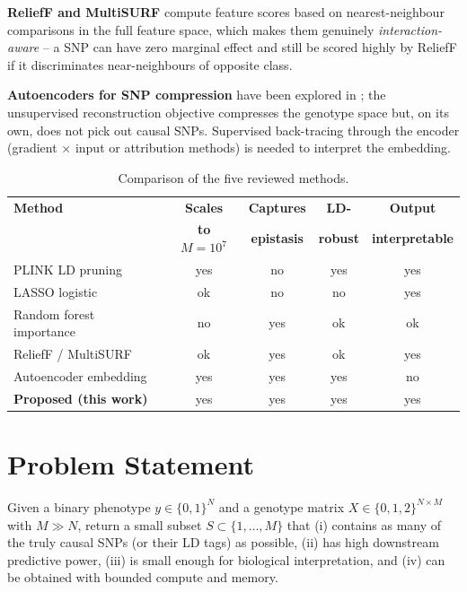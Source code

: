\documentclass[11pt,a4paper]{article}
\begin{document}
\textbf{ReliefF and MultiSURF} \cite{urbanowicz18} compute feature scores
based on nearest-neighbour comparisons in the full feature space, which
makes them genuinely \emph{interaction-aware} -- a SNP can have zero
marginal effect and still be scored highly by ReliefF if it discriminates
near-neighbours of opposite class.

\textbf{Autoencoders for SNP compression} have been explored in
\cite{romero17}; the unsupervised reconstruction objective compresses the
genotype space but, on its own, does not pick out causal SNPs. Supervised
back-tracing through the encoder (gradient $\times$ input or attribution
methods) is needed to interpret the embedding.

\begin{table}[H]
\centering
\caption{Comparison of the five reviewed methods. \label{tab:litreview}}
\begin{tabular}{lcccc}
\toprule
\textbf{Method} & \textbf{Scales} & \textbf{Captures} & \textbf{LD-} & \textbf{Output} \\
                & \textbf{to $M{=}10^7$} & \textbf{epistasis} & \textbf{robust} & \textbf{interpretable} \\
\midrule
PLINK LD pruning              & yes & no  & yes & yes \\
LASSO logistic                & ok  & no  & no  & yes \\
Random forest importance      & no  & yes & ok  & ok \\
ReliefF / MultiSURF           & ok  & yes & ok  & yes \\
Autoencoder embedding         & yes & yes & yes & no  \\
\midrule
\textbf{Proposed (this work)} & yes & yes & yes & yes \\
\bottomrule
\end{tabular}
\end{table}

\section{Problem Statement}
Given a binary phenotype $y \in \{0,1\}^N$ and a genotype matrix
$X \in \{0,1,2\}^{N \times M}$ with $M \gg N$, return a small subset
$S \subset \{1, \ldots, M\}$ that (i) contains as many of the truly
causal SNPs (or their LD tags) as possible, (ii) has high downstream
predictive power, (iii) is small enough for biological interpretation,
and (iv) can be obtained with bounded compute and memory.
\end{document}
